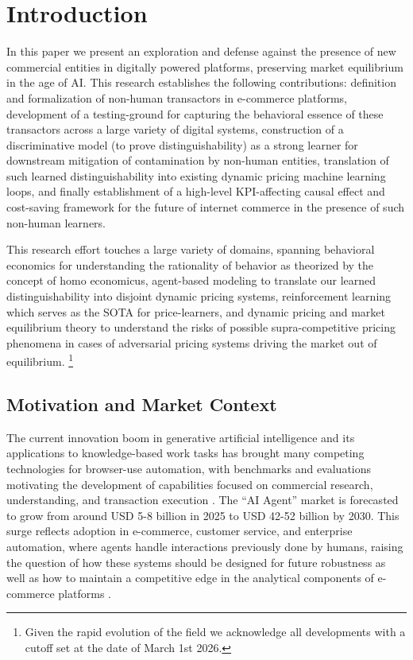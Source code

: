 
\section{Introduction}

In this paper we present an exploration and defense against the presence of new commercial entities in digitally powered platforms, preserving market equilibrium in the age of AI. This research establishes the following contributions: definition and formalization of non-human transactors in e-commerce platforms, development of a testing-ground for capturing the behavioral essence of these transactors across a large variety of digital systems, construction of a discriminative model (to prove distinguishability) as a strong learner for downstream mitigation of contamination by non-human entities, translation of such learned distinguishability into existing dynamic pricing machine learning loops, and finally establishment of a high-level KPI-affecting causal effect and cost-saving framework for the future of internet commerce in the presence of such non-human learners.

This research effort touches a large variety of domains, spanning behavioral economics for understanding the rationality of behavior as theorized by the concept of homo economicus, agent-based modeling to translate our learned distinguishability into disjoint dynamic pricing systems, reinforcement learning which serves as the SOTA for price-learners, and dynamic pricing and market equilibrium theory to understand the risks of possible supra-competitive pricing phenomena in cases of adversarial pricing systems driving the market out of equilibrium. \footnote{Given the rapid evolution of the field we acknowledge all developments with a cutoff set at the date of March 1st 2026.}

\subsection{Motivation and Market Context}

The current innovation boom in generative artificial intelligence and its applications to knowledge-based work tasks has brought many competing technologies for browser-use automation, with benchmarks and evaluations \parencite{xia_evaluation-driven_2025} motivating the development of capabilities focused on commercial research, understanding, and transaction execution \parencite{xie_osworld_2024}. The ``AI Agent'' market is forecasted to grow from around USD 5-8 billion in 2025 to USD 42-52 billion by 2030. This surge reflects adoption in e-commerce, customer service, and enterprise automation, where agents handle interactions previously done by humans, raising the question of how these systems should be designed for future robustness as well as how to maintain a competitive edge in the analytical components of e-commerce platforms \parencite{markntel_advisors_global_2025}.


